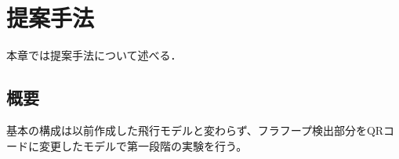 \chapter{提案手法}
\label{proposed}

本章では提案手法について述べる．

\section{概要}
基本の構成は以前作成した飛行モデルと変わらず、フラフープ検出部分をQRコードに変更したモデルで第一段階の実験を行う。



